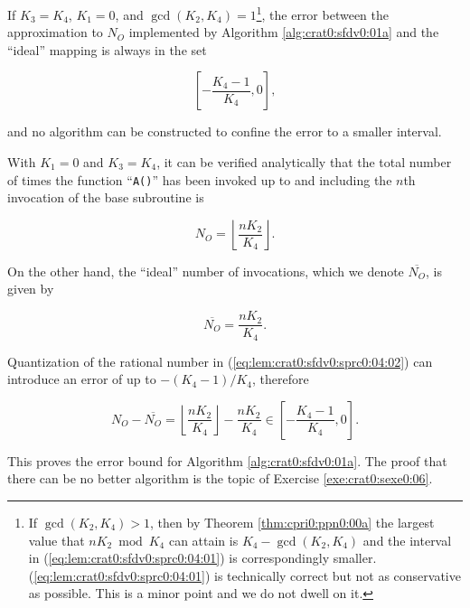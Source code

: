 \begin{vworklemmastatement}
\label{lem:crat0:sfdv0:sprc0:04}
If $K_3=K_4$, $K_1=0$, and 
$\gcd(K_2, K_4)=1$\footnote{\label{footnote:lem:crat0:sfdv0:sprc0:04:01}If
$\gcd(K_2, K_4) > 1$, then by Theorem
\ref{thm:cpri0:ppn0:00a} the largest 
value that $n K_2 \bmod K_4$ can attain is 
$K_4-\gcd(K_2, K_4)$ and the interval in
(\ref{eq:lem:crat0:sfdv0:sprc0:04:01}) is correspondingly
smaller.  (\ref{eq:lem:crat0:sfdv0:sprc0:04:01}) is
technically correct but not as conservative as possible.
This is a minor point and we do not dwell on it.}, the error between
the approximation to $N_O$ implemented by
Algorithm \ref{alg:crat0:sfdv0:01a} and the ``ideal'' mapping is always
in the set

\begin{equation}
\label{eq:lem:crat0:sfdv0:sprc0:04:01}
\left[ - \frac{K_4 - 1}{K_4} , 0 \right] ,
\end{equation}

and no algorithm can be constructed to 
confine the error to a smaller interval.
\end{vworklemmastatement}
\begin{vworklemmaproof}
With $K_1=0$ and $K_3 = K_4$, it can be verified analytically that
the total number of times the function ``\texttt{A()}'' has been
invoked up to and including the $n$th invocation of the base subroutine
is 

\begin{equation}
\label{eq:lem:crat0:sfdv0:sprc0:04:02}
N_O = \left\lfloor \frac{n K_2}{K_4} \right\rfloor .
\end{equation}

On the other hand, the ``ideal'' number of invocations, which
we denote $\overline{N_O}$, is given by

\begin{equation}
\label{eq:lem:crat0:sfdv0:sprc0:04:03}
\overline{N_O} = \frac{n K_2}{K_4} .
\end{equation}

Quantization of the rational number in (\ref{eq:lem:crat0:sfdv0:sprc0:04:02})
can introduce an error of up to $-(K_4-1)/K_4$, therefore

\begin{equation}
\label{eq:lem:crat0:sfdv0:sprc0:04:04}
N_O - \overline{N_O} =
\left\lfloor \frac{n K_2}{K_4} \right\rfloor - \frac{n K_2}{K_4} 
\in \left[ - \frac{K_4 - 1}{K_4} , 0 \right] .
\end{equation}

This proves the error bound for Algorithm \ref{alg:crat0:sfdv0:01a}.
The proof that there can be no better algorithm is the topic
of Exercise \ref{exe:crat0:sexe0:06}.
\end{vworklemmaproof}
